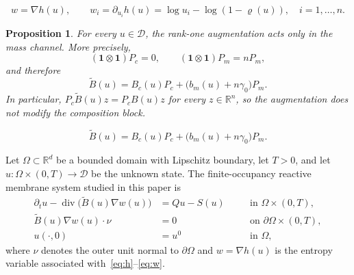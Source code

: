 \documentclass[10pt,a4paper]{amsart}
\newtheorem{proposition}{Proposition}
\newcommand{\Be}{\widetilde{B}}       %
\newcommand{\D}{\mathcal{D}}
\newcommand{\Pc}{P_c}                 %
\newcommand{\Pm}{P_m}                 %
\newcommand{\R}{\mathbb{R}}
\newcommand{\bone}{\mathbf{1}}
\begin{document}
\begin{equation}\label{eq:w}
  w = \nabla h(u), \qquad
  w_i = \partial_{u_i}h(u) = \log u_i - \log(1-\varrho(u)),
  \quad i=1,\dots,n.
\end{equation}

\begin{proposition}\label{prop:augm}
For every $u\in\D$, the rank-one augmentation acts only in the mass
channel. More precisely,
\begin{equation*}
  (\bone\otimes\bone)\Pc = 0, \qquad
  (\bone\otimes\bone)\Pm = n\Pm,
\end{equation*}
and therefore
\begin{equation}\label{eq:Be}
  \Be(u) = B_c(u)\Pc + \bigl(b_m(u)+n\gamma_0\bigr)\Pm.
\end{equation}
In particular, $\Pc\Be(u)z = \Pc B(u)z$ for every $z\in\R^n$, so the
augmentation does not modify the composition block.
\end{proposition}

\begin{equation}
  \Be(u) = B_c(u)\Pc + \bigl(b_m(u)+n\gamma_0\bigr)\Pm.
\end{equation}

Let $\Omega\subset\R^d$ be a bounded domain with Lipschitz boundary,
let $T>0$, and let $u:\Omega\times(0,T)\to\D$ be the unknown state.
The finite-occupancy reactive membrane system studied in this paper is
\begin{subequations}\label{eq:sys}
\begin{alignat}{2}
  \partial_t u - \operatorname{div}\bigl(\Be(u)\nabla w(u)\bigr)
    &= Qu - S(u)
    &&\quad\text{in }\Omega\times(0,T),
    \label{eq:pde}\\
  \Be(u)\nabla w(u)\cdot\nu
    &= 0
    &&\quad\text{on }\partial\Omega\times(0,T),
    \label{eq:bc}\\
  u(\cdot,0) &= u^0
    &&\quad\text{in }\Omega,
    \end{alignat}
\end{subequations}
where $\nu$ denotes the outer unit normal to $\partial\Omega$ and
$w=\nabla h(u)$ is the entropy variable associated with~\eqref{eq:h}--\eqref{eq:w}.
\end{document}

